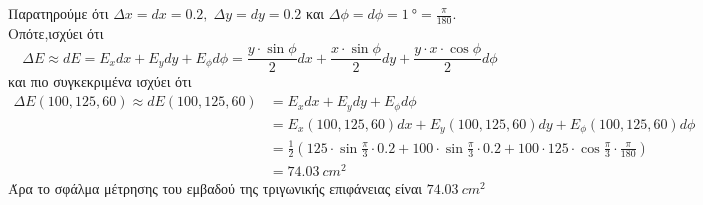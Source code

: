 \documentclass[a4paper,table]{report}
\begin{document}
\begin{solution}
\item {}

  Παρατηρούμε ότι $ \Delta x = dx = 0.2, \; \Delta y = dy = 0.2 $ και 
  $ \Delta \phi = d\phi = \SI{1}{\degree} = \frac{\pi}{180} $. Οπότε,ισχύει ότι
  \begin{equation*}
    \Delta E \approx dE = E_{x} dx + E_{y} dy + E_{\phi} d\phi = \frac{y \cdot
    \sin{\phi}}{2} dx + \frac{x \cdot \sin{\phi}}{2} dy + 
    \frac{y \cdot x \cdot \cos{\phi}}{2} d\phi
  \end{equation*} 
  και πιο συγκεκριμένα ισχύει ότι 
  \begin{align*}
    \Delta E(100,125,60) \approx dE(100,125,60) 
  &= E_{x} dx + E_{y} dy + E_{\phi} d\phi \\
  &= E_{x}(100,125,60) dx + E_{y}(100,125,60) dy + E_{\phi}(100,125,60) d\phi \\
  &= \frac{1}{2} \left(125 \cdot \sin{\frac{\pi}{3}} \cdot 0.2 + 100 \cdot
    \sin{\frac{\pi}{3}} \cdot 0.2 + 100 \cdot 125 \cdot \cos{\frac{\pi}{3}} \cdot
  \frac{\pi}{180}\right) \\
  &= \SI{74.03}{cm^{2}}
  \end{align*}
  Άρα το σφάλμα μέτρησης του εμβαδού της τριγωνικής επιφάνειας είναι 
  $ \SI{74.03}{cm^{2}} $
\end{solution}
\end{document}
